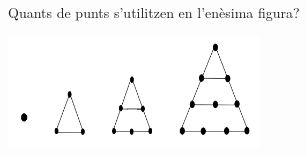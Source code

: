 {\begin{tasks}
 
 
 	\task  Quants de punts s'utilitzen en l'enèsima figura?
 	
 			\begin{center}
 			\includegraphics[width=0.5\textwidth]{img-sol/serie-1}
 			\end{center} 
  
 \end{tasks}
}


\newcommand{\pagelii}{

\heading{Simulacions interactives de probabilitat}

\begin{itemize}
	\item Llançament d'una moneda: \url{https://piworld.es/\#!/home/activity/71/0}
	\item Llançament d'un dau: \url{https://piworld.es/\#!/home/activity/94/0}
	\item Ruleta: \url{https://piworld.es/\#!/home/activity/97/0}
	\item Llançament de dos daus: \url{https://piworld.es/\#!/home/activity/98/0}
	\item Laberint de conills: \url{https://piworld.es/\#!/home/activity/95/0}
	\item Dates d'aniversaris: \url{https://piworld.es/\#!/home/activity/99/0}
	\item Caminata del borracho:  \url{https://piworld.es/\#!/home/activity/96/0}
\end{itemize}

}

